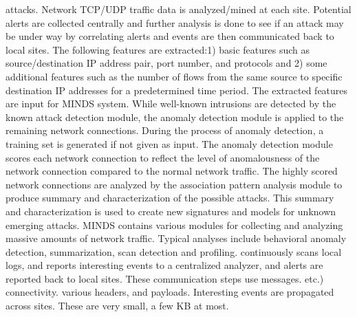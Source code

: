 \documentclass[times]{cpeauth}
\begin{document}
%
%
%
attacks.  Network TCP/UDP traffic data is analyzed/mined at each site. Potential
alerts are collected centrally and further analysis is done to see if an attack
may be under way by correlating alerts and events are then communicated back to
local sites. The following features are extracted:1) basic features such as
source/destination IP address pair, port number, and protocols and 2) some
additional features such as the number of flows from the same source to specific
destination IP addresses for a predetermined time period. The extracted features
are input for MINDS system. While well-known intrusions are detected by the
known attack detection module, the anomaly detection module is applied to the
remaining network connections. During the process of anomaly detection, a
training set is generated if not given as input. The anomaly detection module
scores each network connection to reflect the level of anomalousness of the
network connection compared to the normal network traffic. The highly scored
network connections are analyzed by the association pattern analysis module to
produce summary and characterization of the possible attacks. This summary and
characterization is used to create new signatures and models for unknown
emerging attacks. MINDS contains various modules for collecting and analyzing
massive amounts of network traffic. Typical analyses include behavioral anomaly
detection, summarization, scan detection and profiling.
%
%
continuously scans local logs, and reports interesting events to a centralized
analyzer, and alerts are reported back to local sites.  These communication
steps use messages.
%
etc.)
%
connectivity.
%
%
%
%
various headers, and payloads. Interesting events are propagated across
sites. These are very small, a few KB at most.
%
\end{document}

